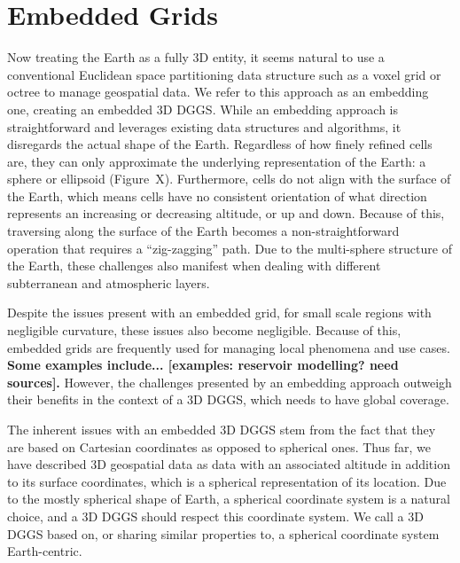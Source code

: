 \section{Embedded Grids} \label{chap:3:embedded}
Now treating the Earth as a fully 3D entity, it seems natural to use a conventional Euclidean space partitioning data structure such as a voxel grid or octree to manage geospatial data.
We refer to this approach as an embedding one, creating an embedded 3D DGGS.
While an embedding approach is straightforward and leverages existing data structures and algorithms, it disregards the actual shape of the Earth.
Regardless of how finely refined cells are, they can only approximate the underlying representation of the Earth: a sphere or ellipsoid (Figure~X).
Furthermore, cells do not align with the surface of the Earth, which means cells have no consistent orientation of what direction represents an increasing or decreasing altitude, or up and down.
Because of this, traversing along the surface of the Earth becomes a non-straightforward operation that requires a ``zig-zagging'' path.
Due to the multi-sphere structure of the Earth, these challenges also manifest when dealing with different subterranean and atmospheric layers.


Despite the issues present with an embedded grid, for small scale regions with negligible curvature, these issues also become negligible.
Because of this, embedded grids are frequently used for managing local phenomena and use cases.
\textbf{Some examples include... [examples: reservoir modelling? need sources].}
However, the challenges presented by an embedding approach outweigh their benefits in the context of a 3D DGGS, which needs to have global coverage.


The inherent issues with an embedded 3D DGGS stem from the fact that they are based on Cartesian coordinates as opposed to spherical ones.
Thus far, we have described 3D geospatial data as data with an associated altitude in addition to its surface coordinates, which is a spherical representation of its location.
Due to the mostly spherical shape of Earth, a spherical coordinate system is a natural choice, and a 3D DGGS should respect this coordinate system.
We call a 3D DGGS based on, or sharing similar properties to, a spherical coordinate system Earth-centric.


